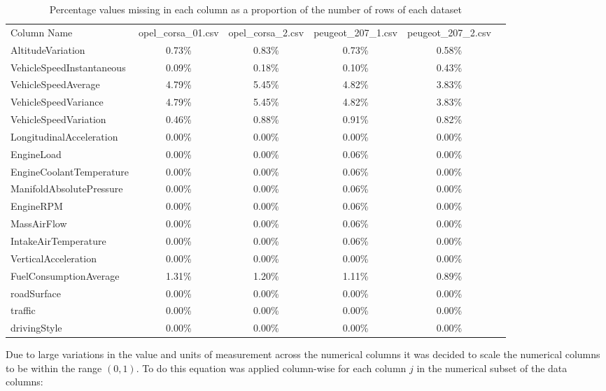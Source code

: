 \documentclass[a4paper,11pt]{article}
\begin{document}
\begin{table}[!ht]
	\caption{Percentage values missing in each column as a proportion of the number of rows of each dataset}\label{tab:column_types}
	\centering
	\begin{tabular}{lccccc}\toprule
		Column Name & opel\_corsa\_01.csv & opel\_corsa\_2.csv & peugeot\_207\_1.csv & peugeot\_207\_2.csv \\ 
		AltitudeVariation & 0.73\% & 0.83\% & 0.73\% & 0.58\% \\ 
		VehicleSpeedInstantaneous & 0.09\% & 0.18\% & 0.10\% & 0.43\% \\ 
		VehicleSpeedAverage & 4.79\% & 5.45\% & 4.82\% & 3.83\% \\ 
		VehicleSpeedVariance & 4.79\% & 5.45\% & 4.82\% & 3.83\% \\ 
		VehicleSpeedVariation & 0.46\% & 0.88\% & 0.91\% & 0.82\% \\ 
		LongitudinalAcceleration & 0.00\% & 0.00\% & 0.00\% & 0.00\% \\ 
		EngineLoad & 0.00\% & 0.00\% & 0.06\% & 0.00\% \\ 
		EngineCoolantTemperature & 0.00\% & 0.00\% & 0.06\% & 0.00\% \\ 
		ManifoldAbsolutePressure & 0.00\% & 0.00\% & 0.06\% & 0.00\% \\ 
		EngineRPM & 0.00\% & 0.00\% & 0.06\% & 0.00\% \\ 
		MassAirFlow & 0.00\% & 0.00\% & 0.06\% & 0.00\% \\ 
		IntakeAirTemperature & 0.00\% & 0.00\% & 0.06\% & 0.00\% \\ 
		VerticalAcceleration & 0.00\% & 0.00\% & 0.00\% & 0.00\% \\ 
		FuelConsumptionAverage & 1.31\% & 1.20\% & 1.11\% & 0.89\% \\ 
		roadSurface & 0.00\% & 0.00\% & 0.00\% & 0.00\% \\ 
		traffic & 0.00\% & 0.00\% & 0.00\% & 0.00\% \\ 
		drivingStyle & 0.00\% & 0.00\% & 0.00\% & 0.00\% \\ \bottomrule
	\end{tabular}
\end{table}

Due to large variations in the value and units of measurement across the numerical columns it was decided to scale the numerical columns to be within the range $(0,1)$. To do this equation was applied column-wise for each column $j$ in the numerical subset of the data columns:
\end{document}
